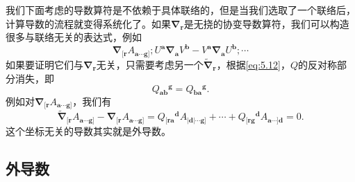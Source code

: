 我们下面考虑的导数算符是不依赖于具体联络的，但是当我们选取了一个联络后，计算导数的流程就变得系统化了。如果$\boldsymbol{\nabla }_{\boldsymbol{r}}$是无挠的协变导数算符，我们可以构造很多与联络无关的表达式，例如
\begin{equation*}
	\boldsymbol{\nabla }_{[\boldsymbol{r}} A_{\boldsymbol{a} \cdots \boldsymbol{g}]} ;U^{\boldsymbol{a}}\boldsymbol{\nabla }_{\boldsymbol{a}} V^{\boldsymbol{b}} -V^{\boldsymbol{a}}\boldsymbol{\nabla }_{\boldsymbol{a}} U^{\boldsymbol{b}} ;\cdots 
\end{equation*}
如果要证明它们与$\boldsymbol{\nabla }_{\boldsymbol{r}}$无关，只需要考虑另一个$\tilde{\boldsymbol{\nabla }}_{\boldsymbol{r}}$，根据\ref{eq:5.12}，$Q$的反对称部分消失，即
\begin{equation*}
	Q{_{\boldsymbol{ab}}}^{\boldsymbol{g}} =Q{_{\boldsymbol{ba}}}^{\boldsymbol{g}} .
\end{equation*}
例如对$\boldsymbol{\nabla }_{[\boldsymbol{r}} A_{\boldsymbol{a} \cdots \boldsymbol{g}]}$，我们有
\begin{equation}
	\tilde{\boldsymbol{\nabla }}_{[\boldsymbol{r}} A_{\boldsymbol{a} \cdots \boldsymbol{g}]} -\boldsymbol{\nabla }_{[\boldsymbol{r}} A_{\boldsymbol{a} \cdots \boldsymbol{g}]} =Q{_{[\boldsymbol{ra}}}^{\boldsymbol{d}} A_{|\boldsymbol{d} |\cdots \boldsymbol{g}]} +\cdots +Q{_{[\boldsymbol{rg}}}^{\boldsymbol{d}} A_{\boldsymbol{a} \cdots ]\boldsymbol{d}} =0.
	\label{eq:5.14}
\end{equation}
这个坐标无关的导数其实就是外导数。
\subsection{外导数}

